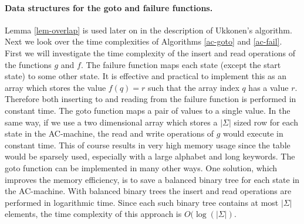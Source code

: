 \documentclass[english,twoside,censored,csm,algorithms-track-2020]{HYthesisML}
\theoremstyle{plain}
\theoremstyle{definition}
\begin{document}
\paragraph{Data structures for the goto and failure functions.}
Lemma \ref{lem-overlap} is used later on in the description of Ukkonen's algorithm. Next we look
over the time complexities of Algorithms \ref{ac-goto} and \ref{ac-fail}. First we will investigate
the time complexity of the insert and read operations of the functions $g$ and $f$. The failure
function maps each state (except the start state) to some other state. It is effective and practical
to implement this as an array which stores the value $f(q)=r$ such that the array index $q$ has
a value $r$. Therefore both inserting to and reading from the failure function is performed
in constant time. The goto function maps a pair of values to a single value.
In the same way, if we use a two dimensional array which stores
a $|\Sigma|$ sized row for each state in the AC-machine, the read and write operations of $g$ would
execute in constant time. This of course results in very high memory usage since the table would be
sparsely used, especially with a large alphabet and long keywords. The goto function can
be implemented in many other ways. One solution, which improves the memory efficiency, is to save
a balanced binary tree for each state in the AC-machine. With balanced binary trees the insert and read
operations are performed in logarithmic time. Since each such binary tree contains at most $|\Sigma|$
elements, the time complexity of this approach is $O(\log(|\Sigma|)$.
\end{document}
